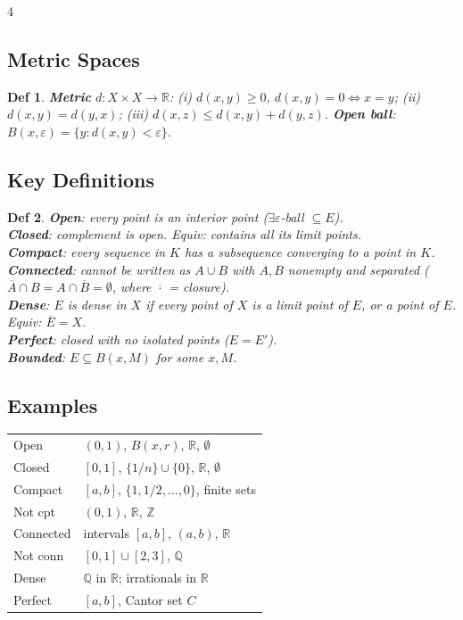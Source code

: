 \documentclass[9pt,landscape]{extarticle}
\newcommand{\R}{\mathbb{R}}
\newcommand{\Z}{\mathbb{Z}}
\newcommand{\Q}{\mathbb{Q}}
\newcommand{\eps}{\varepsilon}
\theoremstyle{compact}
\theoremstyle{defnstyle}
\newtheorem*{defn}{Def}
\begin{document}
\begin{multicols}{4}
\subsection{Metric Spaces}
\begin{defn}
\textbf{Metric} $d: X \times X \to \R$: (i) $d(x,y) \geq 0$, $d(x,y)=0 \Leftrightarrow x=y$; (ii) $d(x,y)=d(y,x)$; (iii) $d(x,z) \leq d(x,y)+d(y,z)$. \textbf{Open ball}: $B(x,\eps) = \{y : d(x,y) < \eps\}$.
\end{defn}

\subsection{Key Definitions}
\begin{defn}
\textbf{Open}: every point is an interior point ($\exists \eps$-ball $\subseteq E$).\\
\textbf{Closed}: complement is open. Equiv: contains all its limit points.\\
\textbf{Compact}: every sequence in $K$ has a subsequence converging to a point in $K$.\\
\textbf{Connected}: cannot be written as $A \cup B$ with $A, B$ nonempty and separated ($\overline{A}\cap B = A \cap \overline{B} = \emptyset$, where $\overline{\cdot}$ = closure).\\
\textbf{Dense}: $E$ is dense in $X$ if every point of $X$ is a limit point of $E$, or a point of $E$. Equiv: $\overline{E} = X$.\\
\textbf{Perfect}: closed with no isolated points ($E = E'$).\\
\textbf{Bounded}: $E \subseteq B(x,M)$ for some $x, M$.
\end{defn}

\subsection{Examples}

\begin{tabular}{@{}p{38pt}p{122pt}@{}}
Open & $(0,1)$, $B(x,r)$, $\R$, $\emptyset$ \\
Closed & $[0,1]$, $\{1/n\}\cup\{0\}$, $\R$, $\emptyset$ \\
Compact & $[a,b]$, $\{1,1/2,\ldots,0\}$, finite sets \\
Not cpt & $(0,1)$, $\R$, $\Z$ \\
Connected & intervals $[a,b]$, $(a,b)$, $\R$ \\
Not conn & $[0,1]\cup[2,3]$, $\Q$ \\
Dense & $\Q$ in $\R$; irrationals in $\R$ \\
Perfect & $[a,b]$, Cantor set $C$ \\
\end{tabular}


\end{multicols}
\end{document}
